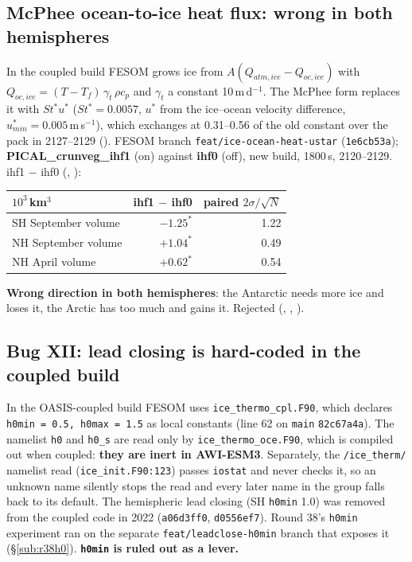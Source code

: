 \documentclass[10pt]{article}
\begin{document}
\subsection{McPhee ocean-to-ice heat flux: wrong in both hemispheres}\label{sub:r45mcphee}

In the coupled build FESOM grows ice from $A(Q_{atm,ice}-Q_{oc,ice})$ with
$Q_{oc,ice}=(T-T_f)\,\gamma_t\,\rho c_p$ and $\gamma_t$ a constant 10\,m\,d$^{-1}$. The McPhee form
replaces it with $St^*u^*$ ($St^*=0.0057$, $u^*$ from the ice--ocean velocity difference,
$u^*_{min}=0.005$\,m\,s$^{-1}$), which exchanges at 0.31--0.56 of the old constant over the pack in 2127--2129
(). FESOM branch \texttt{feat/ice-ocean-heat-ustar}
(\texttt{1e6cb53a}); \textbf{PICAL\_crunveg\_ihf1} (on) against \textbf{ihf0} (off), new build,
1800\,s, 2120--2129. ihf1 $-$ ihf0 (, ):

\begin{center}\small
\begin{tabular}{lrr}
\toprule
$10^3$\,km$^3$ & ihf1 $-$ ihf0 & paired $2\sigma/\sqrt{N}$ \\
\midrule
SH September volume & $-1.25^*$ & 1.22 \\
NH September volume & $+1.04^*$ & 0.49 \\
NH April volume     & $+0.62^*$ & 0.54 \\
\bottomrule
\end{tabular}
\end{center}

\textbf{Wrong direction in both hemispheres}: the Antarctic needs more ice and loses it, the Arctic
has too much and gains it. Rejected (,
, ).

\subsection{Bug XII: lead closing is hard-coded in the coupled build}\label{sub:r45h0}

In the OASIS-coupled build FESOM uses \texttt{ice\_thermo\_cpl.F90}, which declares
\texttt{h0min = 0.5, h0max = 1.5} as local constants (line 62 on \texttt{main} \texttt{82c67a4a}).
The namelist \texttt{h0} and \texttt{h0\_s} are read only by \texttt{ice\_thermo\_oce.F90}, which is
compiled out when coupled: \textbf{they are inert in AWI-ESM3}. Separately, the \texttt{/ice\_therm/}
namelist read (\texttt{ice\_init.F90:123}) passes \texttt{iostat} and never checks it, so an unknown
name silently stops the read and every later name in the group falls back to its default. The
hemispheric lead closing (SH \texttt{h0min} 1.0) was removed from the coupled code in 2022
(\texttt{a06d3ff0}, \texttt{d0556ef7}). Round 38's \texttt{h0min} experiment ran on the separate
\texttt{feat/leadclose-h0min} branch that exposes it (\S\ref{sub:r38h0}). \textbf{\texttt{h0min} is
ruled out as a lever.}
\end{document}
